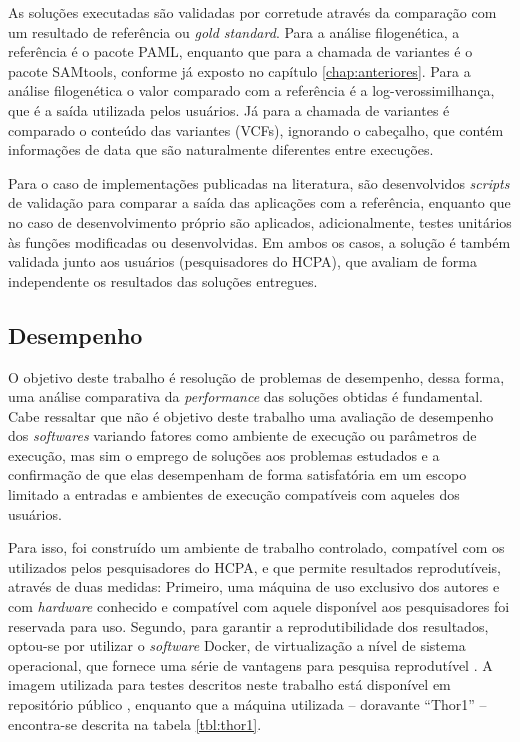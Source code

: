\documentclass[cic,tc]{iiufrgs}
\begin{document}
As soluções executadas são validadas por corretude através da comparação com um
resultado de referência ou \textit{gold standard}. Para a análise filogenética,
a referência é o pacote PAML, enquanto que para a chamada de variantes é o
pacote SAMtools, conforme já exposto no capítulo \ref{chap:anteriores}. Para a
análise filogenética o valor comparado com a referência é a
log-verossimilhança, que é a saída utilizada pelos usuários. Já para a chamada
de variantes é comparado o conteúdo das variantes (VCFs), ignorando o
cabeçalho, que contém informações de data que são naturalmente diferentes entre
execuções.

Para o caso de implementações publicadas na literatura, são desenvolvidos
\textit{scripts} de validação para comparar a saída das aplicações com a
referência, enquanto que no caso de desenvolvimento próprio são aplicados,
adicionalmente, testes unitários às funções modificadas ou desenvolvidas. Em
ambos os casos, a solução é também validada junto aos usuários (pesquisadores
do HCPA), que avaliam de forma independente os resultados das soluções
entregues.

\subsection{Desempenho}
\label{sec:perfmethod}

O objetivo deste trabalho é resolução de problemas de desempenho, dessa forma,
uma análise comparativa da \textit{performance} das soluções obtidas é
fundamental. Cabe ressaltar que não é objetivo deste trabalho uma avaliação de
desempenho dos \textit{softwares} variando fatores como ambiente de execução ou
parâmetros de execução, mas sim o emprego de soluções aos problemas estudados e
a confirmação de que elas desempenham de forma satisfatória em um escopo
limitado a entradas e ambientes de execução compatíveis com aqueles dos
usuários.

Para isso, foi construído um ambiente de trabalho controlado, compatível com os
utilizados pelos pesquisadores do HCPA, e que permite resultados reprodutíveis,
através de duas medidas: Primeiro, uma máquina de uso exclusivo dos autores e
com \textit{hardware} conhecido e compatível com aquele disponível aos
pesquisadores foi reservada para uso. Segundo, para garantir a
reprodutibilidade dos resultados, optou-se por utilizar o \textit{software}
Docker, de virtualização a nível de sistema operacional, que fornece uma série
de vantagens para pesquisa reprodutível \cite{boettiger2015introduction}. A
imagem utilizada para testes descritos neste trabalho está disponível em
repositório público \cite{dockerme}, enquanto que a máquina utilizada --
doravante ``Thor1'' -- encontra-se descrita na tabela \ref{tbl:thor1}.
\end{document}
